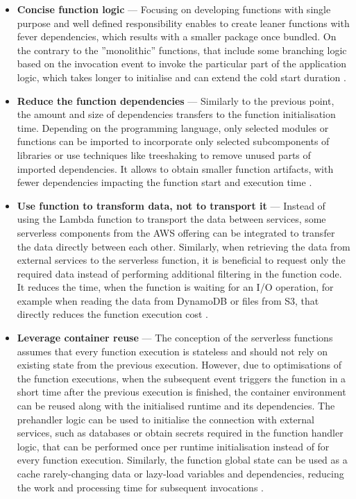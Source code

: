 \begin{itemize}
   \item \textbf{Concise function logic} --- Focusing on developing functions with single purpose and well defined responsibility enables to create leaner functions with fever dependencies, which results with a smaller package once bundled.
   On the contrary to the ''monolithic'' functions, that include some branching logic based on the invocation event to invoke the particular part of the application logic, which takes longer to initialise and can extend the cold start duration \cite{BecomeAServerlessBlackBelt}.
   \item \textbf{Reduce the function dependencies} --- Similarly to the previous point, the amount and size of dependencies transfers to the function initialisation time.
   Depending on the programming language, only selected modules or functions can be imported to incorporate only selected subcomponents of libraries or use techniques like treeshaking to remove unused parts of imported dependencies.
   It allows to obtain smaller function artifacts, with fewer dependencies impacting the function start and execution time \cite{OptimiseYourServerlessApplications}.
   \item \textbf{Use function to transform data, not to transport it} --- Instead of using the Lambda function to transport the data between services, some serverless components from the AWS offering can be integrated to transfer the data directly between each other.
   Similarly, when retrieving the data from external services to the serverless function, it is beneficial to request only the required data instead of performing additional filtering in the function code. It reduces the time, when the function is waiting for an I/O operation, for example when reading the data from DynamoDB or files from S3, that directly reduces the function execution cost \cite{BecomeAServerlessBlackBelt}.
   \item \textbf{Leverage container reuse} --- The conception of the serverless functions assumes that every function execution is stateless and should not rely on existing state from the previous execution.
   However, due to optimisations of the function executions, when the subsequent event triggers the function in a short time after the previous execution is finished, the container environment can be reused along with the initialised runtime and its dependencies.
   The prehandler logic can be used to initialise the connection with external services, such as databases or obtain secrets required in the function handler logic, that can be performed once per runtime initialisation instead of for every function execution.
   Similarly, the function global state can be used as a cache rarely-changing data or lazy-load variables and dependencies, reducing the work and processing time for subsequent invocations \cite{AWSLambdaPerformanceOptimization}.
\end{itemize}

